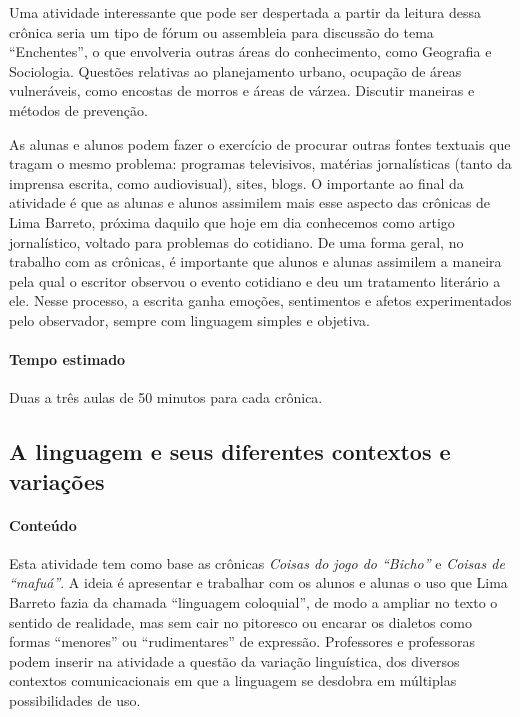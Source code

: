 \documentclass[11pt]{extarticle}
\begin{document}
Uma atividade interessante que pode ser despertada a partir da leitura
dessa crônica seria um tipo de fórum ou assembleia para discussão do
tema ``Enchentes'', o que envolveria outras áreas do conhecimento, como
Geografia e Sociologia. Questões relativas ao planejamento urbano,
ocupação de áreas vulneráveis, como encostas de morros e áreas de
várzea. Discutir maneiras e métodos de prevenção.

As alunas e alunos podem fazer o exercício de procurar outras fontes
textuais que tragam o mesmo problema: programas televisivos, matérias
jornalísticas (tanto da imprensa escrita, como audiovisual), sites,
blogs. O importante ao final da atividade é que as alunas e alunos
assimilem mais esse aspecto das crônicas de Lima Barreto, próxima
daquilo que hoje em dia conhecemos como artigo jornalístico, voltado
para problemas do cotidiano. De uma forma geral, no trabalho com as
crônicas, é importante que alunos e alunas assimilem a maneira pela qual
o escritor observou o evento cotidiano e deu um tratamento literário a
ele. Nesse processo, a escrita ganha emoções, sentimentos e afetos
experimentados pelo observador, sempre com linguagem simples e objetiva.

\paragraph{Tempo estimado} Duas a três aulas de 50 minutos para cada
crônica.


\subsection{A linguagem e seus diferentes contextos e variações}



\paragraph{Conteúdo} Esta atividade tem como base as crônicas
{\textit{Coisas do jogo do ``Bicho''}} e {\textit{Coisas de
``mafuá''}}. A ideia é apresentar e trabalhar com os alunos e alunas o
uso que Lima Barreto fazia da chamada ``linguagem coloquial'', de modo a
ampliar no texto o sentido de realidade, mas sem cair no pitoresco ou
encarar os dialetos como formas ``menores'' ou ``rudimentares'' de
expressão. Professores e professoras podem inserir na atividade a
questão da variação linguística, dos diversos contextos comunicacionais
em que a linguagem se desdobra em múltiplas possibilidades de uso.
\end{document}
